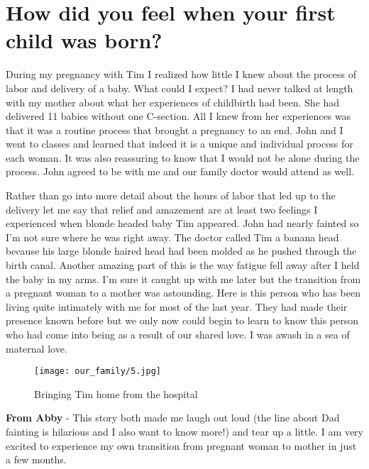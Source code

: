 \section{How did you feel when your first child was born?}
During my pregnancy with Tim I realized how little I knew about the process of labor and delivery of a baby.
What could I expect? I had never talked at length with my mother about what her experiences of childbirth had been.
She had delivered 11 babies without one C-section.
All I knew from her experiences was that it was a routine process that brought a pregnancy to an end.
John and I went to classes and learned that indeed it is a unique and individual process for each woman.
It was also reassuring to know that I would not be alone during the process.
John agreed to be with me and our family doctor would attend as well.

Rather than go into more detail about the hours of labor that led up to the delivery let me say that relief and amazement are at least two feelings I experienced when blonde headed baby Tim appeared.
John had nearly fainted so I'm not sure where he was right away.
The doctor called Tim a banana head because his large blonde haired head had been molded as he pushed through the birth canal.
Another amazing part of this is the way fatigue fell away after I held the baby in my arms.
I'm sure it caught up with me later but the transition from a pregnant woman to a mother was astounding.
Here is this person who has been living quite intimately with me for most of the last year.
They had made their presence known before but we only now could begin to learn to know this person who had come into being as a result of our shared love.
I was awash in a sea of maternal love.
\begin{figure}
\centering
\texttt{[image: our\_family/5.jpg]}
\caption{
Bringing Tim home from the hospital
}
\end{figure}

\textbf{From Abby} - This story both made me laugh out loud (the line about Dad fainting is hilarious and I also want to know more!) and tear up a little.
I am very excited to experience my own transition from pregnant woman to mother in just a few months.





